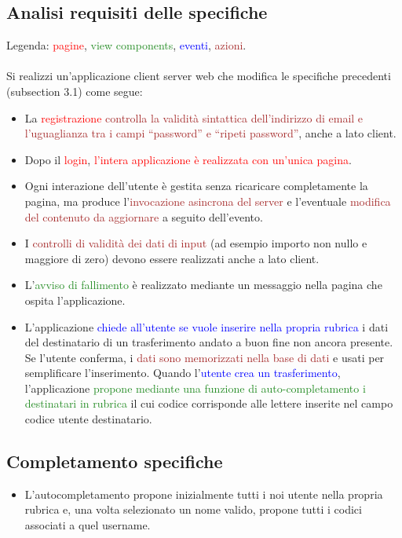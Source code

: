 \documentclass{article}
\begin{document}
\subsection{Analisi requisiti delle specifiche}
Legenda: \textcolor{red}{pagine}, \textcolor{ForestGreen}{view components}, \textcolor{blue}{eventi}, \textcolor{brown}{azioni}.
\\
\\
Si realizzi un’applicazione client server web che modifica le specifiche precedenti (subsection 3.1) come segue:
\begin{itemize}
	\item La  \textcolor{red}{registrazione} \textcolor{brown}{controlla la validità sintattica dell’indirizzo di email e l’uguaglianza tra
		i campi “password” e “ripeti password”}, anche a lato client.
	\item Dopo il  \textcolor{red}{login},  \textcolor{red}{l’intera applicazione è realizzata con un’unica pagina}.
	\item 	Ogni interazione dell’utente è gestita senza ricaricare completamente la pagina, ma
	produce l’\textcolor{brown}{invocazione asincrona del server} e l’eventuale \textcolor{brown}{modifica del contenuto da
		aggiornare} a seguito dell’evento.
	\item I \textcolor{brown}{controlli di validità dei dati di input} (ad esempio importo non nullo e maggiore di zero)
	devono essere realizzati anche a lato client.
	\item L’\textcolor{ForestGreen}{avviso di fallimento} è realizzato mediante un messaggio nella pagina che ospita
	l’applicazione.
	\item L’applicazione \textcolor{blue}{chiede all’utente se vuole inserire nella propria rubrica} i dati del
	destinatario di un trasferimento andato a buon fine non ancora presente. Se l’utente
	conferma, i \textcolor{brown}{dati sono memorizzati nella base di dati} e usati per semplificare
	l’inserimento. Quando l’\textcolor{blue}{utente crea un trasferimento}, l’applicazione  \textcolor{ForestGreen}{propone mediante
		una funzione di auto-completamento i destinatari in rubrica} il cui codice corrisponde
	alle lettere inserite nel campo codice utente destinatario.
\end{itemize}

\subsection{Completamento specifiche}
\begin{itemize}
	\item L'autocompletamento propone inizialmente tutti i noi utente nella propria rubrica e, una volta selezionato un nome valido, propone tutti i codici associati a quel username.
\end{itemize}
\end{document}
